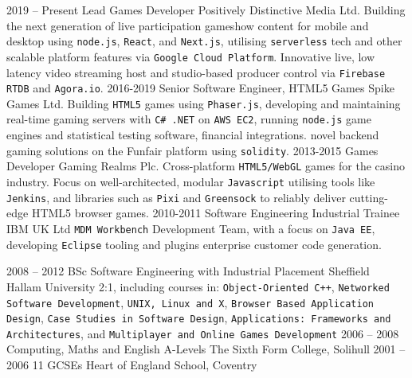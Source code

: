 \documentclass[9pt]{developercv} %
\begin{document}
\begin{entrylist}
	\entry
		{2019 -- Present}
		{Lead Games Developer}
		{Positively Distinctive Media Ltd.}
		{Building the next generation of live participation gameshow content for mobile and desktop using \texttt{node.js},
		\texttt{React}, and \texttt{Next.js}, utilising \texttt{serverless} tech and other scalable platform features via
		\texttt{Google Cloud Platform}. Innovative live, low latency video streaming host and studio-based producer control via
		\texttt{Firebase RTDB} and \texttt{Agora.io}.}
	\entry
		{2016-2019}
		{Senior Software Engineer, HTML5 Games}
		{Spike Games Ltd.}
		{Building \texttt{HTML5} games using \texttt{Phaser.js}, developing and maintaining real-time gaming servers
		 with \texttt{C\# .NET} on  \texttt{AWS EC2}, running \texttt{node.js} game engines and statistical testing software, financial integrations.
		 novel backend gaming solutions on the Funfair platform using \texttt{solidity}.}
	\entry
		{2013-2015}
		{Games Developer}
		{Gaming Realms Plc.}
		{Cross-platform \texttt{HTML5/WebGL} games for the casino industry. Focus on well-architected, modular
		\texttt{Javascript} utilising tools like \texttt{Jenkins}, and libraries such as \texttt{Pixi} and \texttt{Greensock} to reliably deliver cutting-edge HTML5 browser games.}
	\entry
		{2010-2011}
		{Software Engineering Industrial Trainee}
		{IBM UK Ltd}
		{\texttt{MDM Workbench} Development Team, with a focus on \texttt{Java EE}, developing \texttt{Eclipse} tooling and plugins enterprise customer code generation.}
\end{entrylist}



\begin{entrylist}
	\entry
		{2008 -- 2012}
		{BSc Software Engineering with Industrial Placement}
		{Sheffield Hallam University}
		{2:1, including courses in: \texttt{Object-Oriented C++}, \texttt{Networked Software Development},
		\texttt{UNIX, Linux and X},	\texttt{Browser Based Application Design}, \texttt{Case Studies in Software Design},
		\texttt{Applications: Frameworks and Architectures}, and \texttt{Multiplayer and Online Games Development}}
	\entry
		{2006 -- 2008}
		{Computing, Maths and English A-Levels}
		{The Sixth Form College, Solihull}
		{}
	\entry
		{2001 -- 2006}
		{11 GCSEs}
		{Heart of England School, Coventry}
		{}
\end{entrylist}
\end{document}
